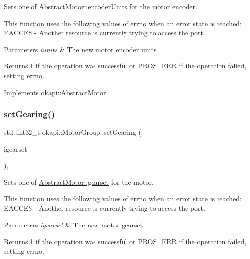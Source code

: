 Sets one of \mbox{\hyperlink{classokapi_1_1AbstractMotor_ae811cd825099f2defadeb1b7f7e7764c}{Abstract\+Motor\+::encoder\+Units}} for the motor encoder.

This function uses the following values of errno when an error state is reached\+: E\+A\+C\+C\+ES -\/ Another resource is currently trying to access the port.


\begin{DoxyParams}{Parameters}
{\em iunits} & The new motor encoder units \\
\hline
\end{DoxyParams}
\begin{DoxyReturn}{Returns}
1 if the operation was successful or P\+R\+O\+S\+\_\+\+E\+RR if the operation failed, setting errno. 
\end{DoxyReturn}


Implements \mbox{\hyperlink{classokapi_1_1AbstractMotor_aae559b72399b0eb2124d969e40f97415}{okapi\+::\+Abstract\+Motor}}.

\mbox{\label{classokapi_1_1MotorGroup_a5720f3775594f0097856754776526a47}} 
\subsubsection{\texorpdfstring{setGearing()}{setGearing()}}
{\footnotesize\ttfamily std\+::int32\+\_\+t okapi\+::\+Motor\+Group\+::set\+Gearing (\begin{DoxyParamCaption}\item[{\mbox{\hyperlink{classokapi_1_1AbstractMotor_a88aaa6ea2fa10f5520a537bbf26774d5}{Abstract\+Motor\+::gearset}}}]{igearset }\end{DoxyParamCaption})\hspace{0.3cm}{\ttfamily [override]}, {\ttfamily [virtual]}}

Sets one of \mbox{\hyperlink{classokapi_1_1AbstractMotor_a88aaa6ea2fa10f5520a537bbf26774d5}{Abstract\+Motor\+::gearset}} for the motor.

This function uses the following values of errno when an error state is reached\+: E\+A\+C\+C\+ES -\/ Another resource is currently trying to access the port.


\begin{DoxyParams}{Parameters}
{\em igearset} & The new motor gearset \\
\hline
\end{DoxyParams}
\begin{DoxyReturn}{Returns}
1 if the operation was successful or P\+R\+O\+S\+\_\+\+E\+RR if the operation failed, setting errno. 
\end{DoxyReturn}


